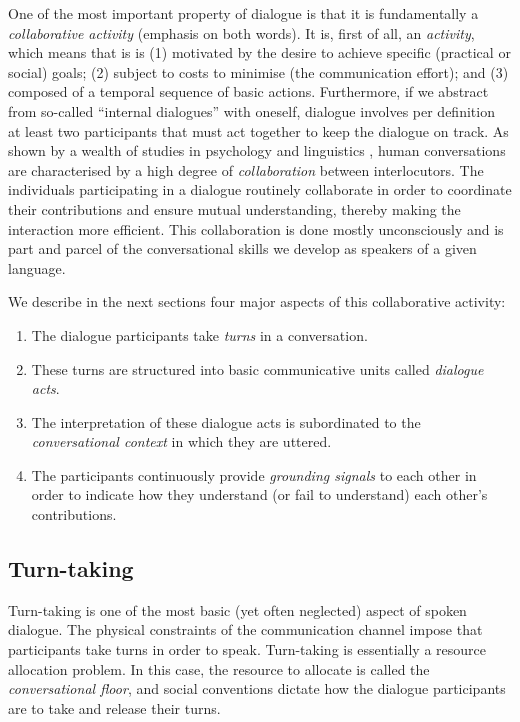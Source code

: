 One of the most important property of dialogue is that it is fundamentally a \textit{collaborative activity} (emphasis on both words).  It is, first of all, an \textit{activity}, which means that is is (1) motivated by the desire to achieve specific (practical or social) goals; (2) subject to costs to minimise (the communication effort); and (3) composed of a temporal sequence of basic actions.  Furthermore, if we abstract from so-called ``internal dialogues'' with oneself, dialogue involves per definition at least two participants that must act together to keep the dialogue on track.  As shown by a wealth of studies in psychology and linguistics \citep{Clark1989,Allwood92,Clark96,Garrod2004,Tomasello2005}, human conversations are characterised by a high degree of \textit{collaboration} between interlocutors.  The individuals participating in a dialogue routinely collaborate in order to coordinate their contributions and ensure mutual understanding, thereby making the interaction more efficient. This collaboration is done mostly unconsciously and is part and parcel of the conversational skills we develop as speakers of a given language. 

We describe in the next sections four major aspects of this collaborative activity: \begin{enumerate}
\item The dialogue participants take \textit{turns} in a conversation.
\item These turns are structured into basic communicative units called \textit{dialogue acts}.
\item The interpretation of these dialogue acts is subordinated to the \textit{conversational context} in which they are uttered. 
\item The participants continuously provide \textit{grounding signals} to each other in order to indicate how they understand (or fail to understand) each other's contributions.
\end{enumerate}

\subsection{Turn-taking}

Turn-taking is one of the most basic (yet often neglected) aspect of spoken dialogue. The physical constraints of the communication channel impose that participants take turns in order to speak.   Turn-taking is essentially a resource allocation problem.  In this case, the resource to allocate is called the \textit{conversational floor}, and social conventions dictate how the dialogue participants are to take and release their turns. 

